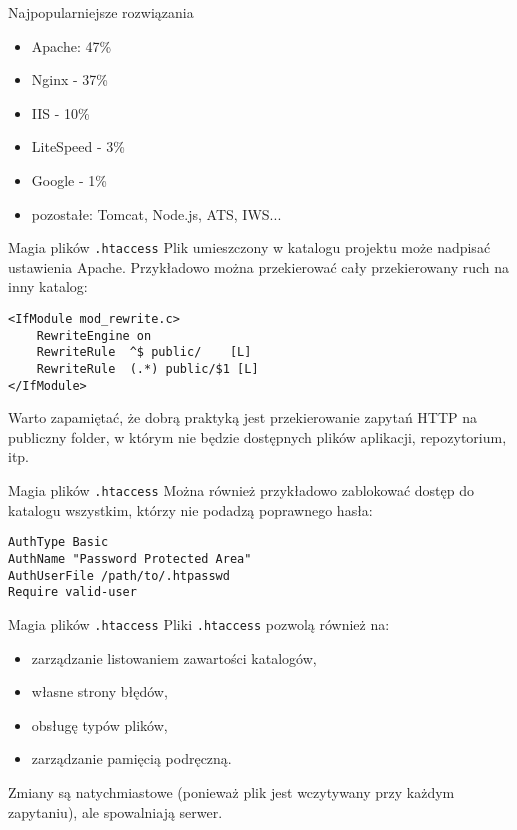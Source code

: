 \begin{frame}{Najpopularniejsze rozwiązania}
	\begin{itemize}
		\item Apache: 47\%
		\item Nginx - 37\%
		\item IIS - 10\%
		\item LiteSpeed - 3\%
		\item Google - 1\%
		\item pozostałe: Tomcat, Node.js, ATS, IWS...
	\end{itemize}
\end{frame}

\begin{frame}[fragile]{Magia plików \texttt{.htaccess}}
	Plik umieszczony w katalogu projektu może nadpisać ustawienia Apache. Przykładowo można przekierować cały przekierowany ruch na inny katalog:
	\begin{lstlisting}
<IfModule mod_rewrite.c>
	RewriteEngine on
	RewriteRule  ^$ public/    [L]
	RewriteRule  (.*) public/$1 [L]
</IfModule>
	\end{lstlisting}
	
	Warto zapamiętać, że dobrą praktyką jest przekierowanie zapytań HTTP na publiczny folder, w którym nie będzie dostępnych plików aplikacji, repozytorium, itp.
\end{frame}

\begin{frame}[fragile]{Magia plików \texttt{.htaccess}}
	Można również przykładowo zablokować dostęp do katalogu wszystkim, którzy nie podadzą poprawnego hasła:
	\begin{lstlisting}
AuthType Basic
AuthName "Password Protected Area"
AuthUserFile /path/to/.htpasswd
Require valid-user
	\end{lstlisting}
\end{frame}

\begin{frame}[fragile]{Magia plików \texttt{.htaccess}}
	Pliki \texttt{.htaccess} pozwolą również na:
	
	\begin{itemize}
		\item zarządzanie listowaniem zawartości katalogów,
		\item własne strony błędów,
		\item obsługę typów plików,
		\item zarządzanie pamięcią podręczną.
	\end{itemize}
	
	 Zmiany są natychmiastowe (ponieważ plik jest wczytywany przy każdym zapytaniu), ale spowalniają serwer.
\end{frame}

